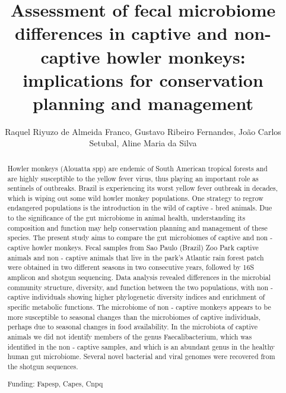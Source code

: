 \documentclass[twoside]{article}
\title{\vspace{-15mm}\fontsize{24pt}{10pt}\selectfont\textbf{ Assessment of fecal microbiome differences in captive and non-captive howler monkeys: implications for conservation planning and management }} %
\author{ Raquel Riyuzo de Almeida Franco, Gustavo Ribeiro Fernandes, Jo\~ao Carlos Setubal, Aline Maria da Silva }
\affil{ Departamento de Bioqu\'{\i}mica,  Instituto de Qu\'{\i}mica,  Universidade de Sao Paulo }
\date{}
\begin{document}
  
  
  \maketitle %
  
  
  \thispagestyle{fancy} %
  
  
  \begin{abstract}
  Howler monkeys (Alouatta spp) are endemic of South American tropical forests and are highly susceptible to the yellow fever virus,  thus playing an important role as sentinels of outbreaks. Brazil is experiencing its worst yellow fever outbreak in decades,  which is wiping out some wild howler monkey populations. One strategy to regrow endangered populations is the introduction in the wild of captive - bred animals. Due to the significance of the gut microbiome in animal health,  understanding its composition and function may help conservation planning and management of these species. The present study aims to compare the gut microbiomes of captive and non - captive howler monkeys. Fecal samples from Sao Paulo (Brazil) Zoo Park captive animals and non - captive animals that live in the park’s Atlantic rain forest patch were obtained in two different seasons in two consecutive years,  followed by 16S amplicon and shotgun sequencing. Data analysis revealed differences in the microbial community structure,  diversity,  and function between the two populations,  with non - captive individuals showing higher phylogenetic diversity indices and enrichment of specific metabolic functions. The microbiome of non - captive monkeys appears to be more susceptible to seasonal changes than the microbiomes of captive individuals,  perhaps due to seasonal changes in food availability. In the microbiota of captive animals we did not identify members of the genus Faecalibacterium,  which was identified in the non - captive samples,  and which is an abundant genus in the healthy human gut microbiome. Several novel bacterial and viral genomes were recovered from the shotgun sequences.
  
  Funding: Fapesp,  Capes,  Cnpq \\ 
  \end{abstract}
  
\end{document}
